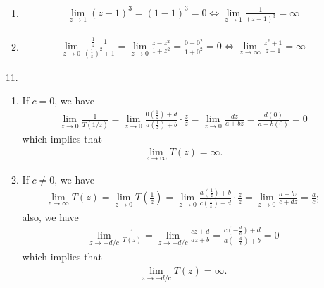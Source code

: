 \documentclass[a4paper,12pt]{article}
\begin{document}
\begin{enumerate}
\begin{enumerate}
            \item
                \begin{align*}
                    \lim_{z \to 1} (z - 1)^3 = (1 - 1)^3 = 0 \Leftrightarrow \lim_{z \to 1} \frac{1}{(z - 1)^3} = \infty
                \end{align*}

            \item
                \begin{align*}
                    \lim_{z \to 0} \frac{\frac{1}{z} - 1}{\left( \frac{1}{z} \right)^2 + 1} = \lim_{z \to 0} \frac{z - z^2}{1 + z^2} = \frac{0 - 0^2}{1 + 0^2} = 0 \Leftrightarrow \lim_{z \to \infty} \frac{z^2 + 1}{z - 1} = \infty
                \end{align*}
        \end{enumerate}

    \item[11.]
        \begin{enumerate}
            \item
                If $c = 0$, we have
                \begin{align*}
                    \lim_{z \to 0} \frac{1}{T(1/z)} = \lim_{z \to 0} \frac{0 \left( \frac{1}{z} \right) + d}{a \left( \frac{1}{z} \right) + b} \cdot \frac{z}{z} = \lim_{z \to 0} \frac{dz}{a + bz} = \frac{d(0)}{a + b(0)} = 0
                \end{align*}
                which implies that
                \begin{align*}
                    \lim_{z \to \infty} T(z) = \infty.
                \end{align*}

            \item
                If $c \neq 0$, we have
                \begin{align*}
                    \lim_{z \to \infty} T(z) = \lim_{z \to 0} T \left( \frac{1}{z} \right) = \lim_{z \to 0} \frac{a \left( \frac{1}{z} \right) + b}{c \left( \frac{1}{z} \right) + d} \cdot \frac{z}{z} = \lim_{z \to 0} \frac{a + bz}{c + dz} = \frac{a}{c};
                \end{align*}
                also, we have
                \begin{align*}
                    \lim_{z \to -d/c} \frac{1}{T(z)} = \lim_{z \to -d/c} \frac{cz + d}{az + b} = \frac{c \left( -\frac{d}{c} \right) + d}{a \left( -\frac{d}{c} \right) + b} = 0
                \end{align*}
                which implies that
                \begin{align*}
                    \lim_{z \to -d/c} T(z) = \infty.
                \end{align*}
        \end{enumerate}
\end{enumerate}
\end{document}
